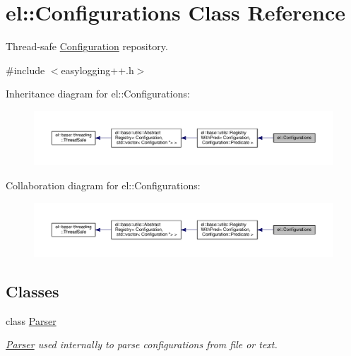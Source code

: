 \hypertarget{classel_1_1_configurations}{}\section{el\+:\+:Configurations Class Reference}
\label{classel_1_1_configurations}


Thread-\/safe \hyperlink{classel_1_1_configuration}{Configuration} repository.  




{\ttfamily \#include $<$easylogging++.\+h$>$}



Inheritance diagram for el\+:\+:Configurations\+:
\nopagebreak
\begin{figure}[H]
\begin{center}
\leavevmode
\includegraphics[width=350pt]{classel_1_1_configurations__inherit__graph}
\end{center}
\end{figure}


Collaboration diagram for el\+:\+:Configurations\+:
\nopagebreak
\begin{figure}[H]
\begin{center}
\leavevmode
\includegraphics[width=350pt]{classel_1_1_configurations__coll__graph}
\end{center}
\end{figure}
\subsection*{Classes}
\begin{DoxyCompactItemize}
\item 
class \hyperlink{classel_1_1_configurations_1_1_parser}{Parser}
\begin{DoxyCompactList}\small\item\em \hyperlink{classel_1_1_configurations_1_1_parser}{Parser} used internally to parse configurations from file or text. \end{DoxyCompactList}\end{DoxyCompactItemize}
